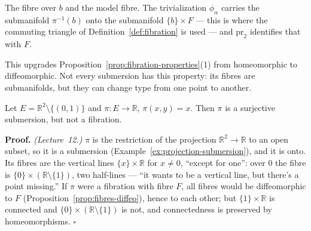 \documentclass[11pt]{report}
\makeatletter
\newcounter{excounter}[section]
\renewenvironment{proof}[1][Proof]{\noindent\textbf{#1.} }{\hfill$\square$\par\vspace{5pt}}
\newcommand{\exlabel}[1]{\edef\@currentlabel{\arabic{section}.\arabic{excounter}}\label{#1}}
\makeatother
\begin{document}
The fibre over $b$ and the model fibre. The trivialization $\phi_\alpha$ carries the submanifold $\pi^{-1}(b)$ onto the submanifold $\{b\} \times F$ --- this is where the commuting triangle of Definition~\ref{def:fibration} is used --- and $\mathrm{pr}_2$ identifies that with $F$.

This upgrades Proposition~\ref{prop:fibration-properties}(1) from homeomorphic to diffeomorphic. Not every submersion has this property: its fibres are submanifolds, but they can change type from one point to another.

\begin{exbox}\exlabel{ex:punctured-plane}
Let $E = \mathbb{R}^2 \setminus \{(0, 1)\}$ and $\pi : E \to \mathbb{R}$, $\pi(x, y) = x$. Then $\pi$ is a surjective submersion, but not a fibration.
\end{exbox}

\begin{proof}
\textit{(Lecture~12.)} $\pi$ is the restriction of the projection $\mathbb{R}^2 \to \mathbb{R}$ to an open subset, so it is a submersion (Example~\ref{ex:projection-submersion}), and it is onto. Its fibres are the vertical lines $\{x\} \times \mathbb{R}$ for $x \ne 0$, ``except for one'': over $0$ the fibre is $\{0\} \times (\mathbb{R} \setminus \{1\})$, two half-lines --- ``it wants to be a vertical line, but there's a point missing.'' If $\pi$ were a fibration with fibre $F$, all fibres would be diffeomorphic to $F$ (Proposition~\ref{prop:fibres-diffeo}), hence to each other; but $\{1\} \times \mathbb{R}$ is connected and $\{0\} \times (\mathbb{R} \setminus \{1\})$ is not, and connectedness is preserved by homeomorphisms.
\end{proof}

\begin{center}
\end{center}
\end{document}
